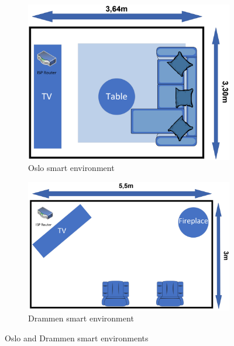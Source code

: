 \begin{figure}[H]
    \centering
    \begin{subfigure}[b]{0.60\textwidth}
        \includegraphics[width=\textwidth]{figures/Environment1.png}
        \caption{Oslo smart environment}
        \label{fig:Environment1}
    \end{subfigure}
    \hfill
    \begin{subfigure}[b]{0.75\textwidth}
        \includegraphics[width=\textwidth]{figures/Environment2.png}
        \caption{Drammen smart environment}
        \label{fig:Environmet2}
    \end{subfigure}
    \caption{Oslo and Drammen smart environments}
    \label{fig:SmartHomeEnvironments}
\end{figure}

